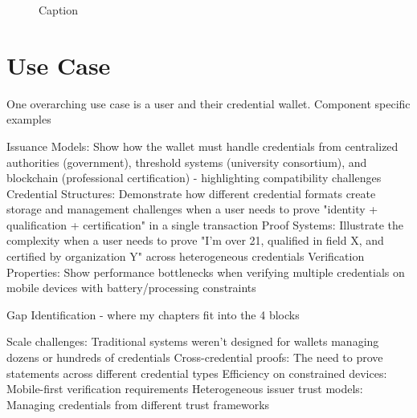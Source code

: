 \begin{figure}
        
  
    \caption{Caption}
    \label{fig:enter-label}
\end{figure}







\section{Use Case}
One overarching use case is a user and their credential wallet.
Component specific examples

Issuance Models: Show how the wallet must handle credentials from centralized authorities (government), threshold systems (university consortium), and blockchain (professional certification) - highlighting compatibility challenges
Credential Structures: Demonstrate how different credential formats create storage and management challenges when a user needs to prove "identity + qualification + certification" in a single transaction
Proof Systems: Illustrate the complexity when a user needs to prove "I'm over 21, qualified in field X, and certified by organization Y" across heterogeneous credentials
Verification Properties: Show performance bottlenecks when verifying multiple credentials on mobile devices with battery/processing constraints

Gap Identification - where my chapters fit into the 4 blocks

Scale challenges: Traditional systems weren't designed for wallets managing dozens or hundreds of credentials
Cross-credential proofs: The need to prove statements across different credential types
Efficiency on constrained devices: Mobile-first verification requirements
Heterogeneous issuer trust models: Managing credentials from different trust frameworks

















